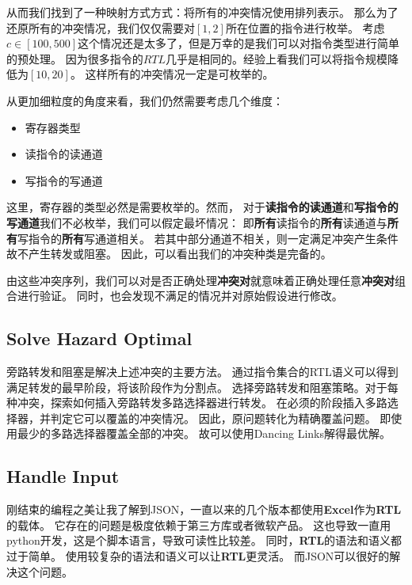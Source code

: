 \documentclass[hyperref,UTF8]{ctexart}
\theoremstyle{definition}
\theoremstyle{remark}
\numberwithin{equation}{subsection}
\newcommand{\Emph}{\textbf}
\begin{document}
	从而我们找到了一种映射方式方式：将所有的冲突情况使用排列表示。
	那么为了还原所有的冲突情况，我们仅仅需要对$[1, 2]$所在位置的指令进行枚举。
	考虑$c \in [100, 500]$这个情况还是太多了，但是万幸的是我们可以对指令类型进行简单的预处理。
	因为很多指令的$RTL$几乎是相同的。经验上看我们可以将指令规模降低为$[10,20]$。
	这样所有的冲突情况一定是可枚举的。
	
	从更加细粒度的角度来看，我们仍然需要考虑几个维度：
	\begin{itemize}
	
		\item 寄存器类型
		
		\item 读指令的读通道
		
		\item 写指令的写通道
		
	\end{itemize}
	这里，寄存器的类型必然是需要枚举的。然而，
	对于\Emph{读指令的读通道}和\Emph{写指令的写通道}我们不必枚举，我们可以假定最坏情况：
	即\Emph{所有}读指令的\Emph{所有}读通道与\Emph{所有}写指令的\Emph{所有}写通道相关。
	若其中部分通道不相关，则一定满足冲突产生条件故不产生转发或阻塞。
	因此，可以看出我们的冲突种类是完备的。
	
	由这些冲突序列，我们可以对是否正确处理\Emph{冲突对}就意味着正确处理任意\Emph{冲突对}组合进行验证。
	同时，也会发现不满足的情况并对原始假设进行修改。

\subsection{Solve Hazard Optimal}
	
	旁路转发和阻塞是解决上述冲突的主要方法。
	通过指令集合的RTL语义可以得到满足转发的最早阶段，将该阶段作为分割点。
	选择旁路转发和阻塞策略。对于每种冲突，探索如何插入旁路转发多路选择器进行转发。
	在必须的阶段插入多路选择器，并判定它可以覆盖的冲突情况。
	因此，原问题转化为精确覆盖问题。
	即使用最少的多路选择器覆盖全部的冲突。
	故可以使用Dancing Links解得最优解。
	
\subsection{Handle Input}

	刚结束的编程之美让我了解到JSON，一直以来的几个版本都使用\Emph{Excel}作为\Emph{RTL}的载体。
	它存在的问题是极度依赖于第三方库或者微软产品。
	这也导致一直用python开发，这是个脚本语言，导致可读性比较差。
	同时，\Emph{RTL}的语法和语义都过于简单。
	使用较复杂的语法和语义可以让\Emph{RTL}更灵活。
	而JSON可以很好的解决这个问题。
	
\end{document}
